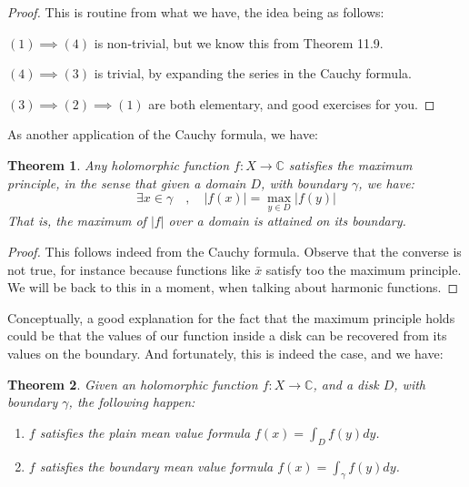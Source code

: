 \documentclass[12pt]{amsbook}
\newtheorem{theorem}{Theorem}[chapter]
\begin{document}
\begin{proof}
This is routine from what we have, the idea being as follows:

\medskip

$(1)\implies(4)$ is non-trivial, but we know this from Theorem 11.9.

\medskip

$(4)\implies(3)$ is trivial, by expanding the series in the Cauchy formula.

\medskip

$(3)\implies(2)\implies(1)$ are both elementary, and good exercises for you.
\end{proof}

As another application of the Cauchy formula, we have:


\begin{theorem}
Any holomorphic function $f:X\to\mathbb C$ satisfies the maximum principle, in the sense that given a domain $D$, with boundary $\gamma$, we have:
$$\exists x\in\gamma\quad,\quad |f(x)|=\max_{y\in D}|f(y)|$$
That is, the maximum of $|f|$ over a domain is attained on its boundary.
\end{theorem}

\begin{proof}
This follows indeed from the Cauchy formula. Observe that the converse is not true, for instance because functions like $\bar{x}$ satisfy too the maximum principle. We will be back to this in a moment, when talking about harmonic functions.
\end{proof}

Conceptually, a good explanation for the fact that the maximum principle holds could be that the values of our function inside a disk can be recovered from its values on the boundary. And fortunately, this is indeed the case, and we have:


\begin{theorem}
Given an holomorphic function $f:X\to\mathbb C$, and a disk $D$, with boundary $\gamma$, the following happen:
\begin{enumerate}
\item $f$ satisfies the plain mean value formula $f(x)=\int_Df(y)dy$.

\item $f$ satisfies the boundary mean value formula $f(x)=\int_\gamma f(y)dy$.
\end{enumerate}
\end{theorem}
\end{document}

